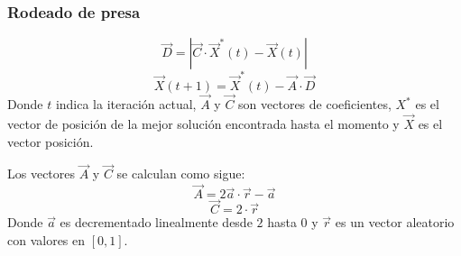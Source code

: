 \subsubsection{Rodeado de presa}
\begin{equation}
    \vec{D}=|\vec{C}\cdot\vec{X}^*(t)-\vec{X}(t)|
\end{equation}
\begin{equation}
    \vec{X}(t+1)=\vec{X}^*(t)-\vec{A}\cdot\vec{D}
\end{equation}
Donde $t$ indica la iteración actual, $\vec{A}$ y $\vec{C}$ son vectores de coeficientes, $X^*$ es el vector de posición de la mejor solución encontrada hasta el momento y $\vec{X}$ es el vector posición.

Los vectores $\vec{A}$ y $\vec{C}$ se calculan como sigue:
\begin{equation}
    \vec{A}=2\vec{a}\cdot\vec{r}-\vec{a}
\end{equation}
\begin{equation}
    \vec{C}=2\cdot\vec{r}
\end{equation}
Donde $\vec{a}$ es decrementado linealmente desde $2$ hasta $0$ y $\vec{r}$ es un vector aleatorio con valores en $[0,1]$.

